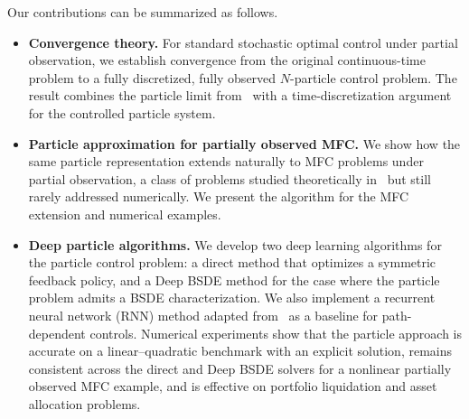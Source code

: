 \documentclass[11pt]{article}
\numberwithin{equation}{section}
\theoremstyle{plain}
\theoremstyle{definition}
\theoremstyle{remark}
\begin{document}
	Our contributions can be summarized as follows.
	\begin{itemize}
		\item {\bf Convergence theory.} For standard stochastic optimal control under partial observation, we establish convergence from the original continuous-time problem to a fully discretized, fully observed $N$-particle control problem. The result combines the particle limit from~\cite{bouchard2025limit} with a time-discretization argument for the controlled particle system.
		
		\item {\bf Particle approximation for partially observed MFC.} We show how the same particle representation extends naturally to MFC problems under partial observation, a class of problems studied theoretically in~\cite{buckdahn2017mean, wan2025discrete, bayer2024continuous, fuhrman2026optimal} but still rarely addressed numerically. We present the algorithm for the MFC extension and numerical examples.
		
		\item {\bf Deep particle algorithms.} We develop two deep learning algorithms for the particle control problem: a direct method that optimizes a symmetric feedback policy, and a Deep BSDE method for the case where the particle problem admits a BSDE characterization. We also implement a recurrent neural network (RNN) method adapted from~\cite{han2021recurrent} as a baseline for path-dependent controls. Numerical experiments show that the particle approach is accurate on a linear--quadratic benchmark with an explicit solution, remains consistent across the direct and Deep BSDE solvers for a nonlinear partially observed MFC example, and is effective on portfolio liquidation and asset allocation problems.
	\end{itemize}
	
\end{document}

